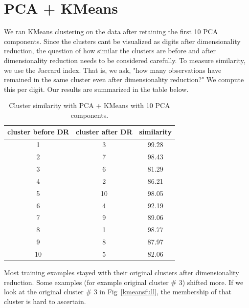 \documentclass[10pt,letterpaper]{article}
\begin{document}
\section{PCA + KMeans}
We ran KMeans clustering on the data after retaining the first 10 PCA components. Since the clusters cant be visualized as digits after dimensionality reduction, the question of how similar the clusters are before and after dimensionality reduction needs to be considered carefully. To measure similarity, we use the Jaccard index. That is, we ask, "how many observations have remained in the same cluster even after dimensionality reduction?" We compute this per digit. Our results are summarized in the table below. 
\begin{table}[tbp]
\begin{center}
\begin{tabular}{c|c|c }
\hline
{\bf cluster before DR}&{\bf cluster after DR}&{\bf similarity} \\ \hline
1 &3&99.28 \\
2 & 7& 98.43\\
3 &6&81.29 \\
4&2&86.21\\
5&10&98.05\\
6&4&92.19\\
7&9&89.06\\
8&1&98.77\\
9&8&87.97\\
10&5&82.06\\ \hline
\end{tabular}
\end{center}
\caption{Cluster similarity with PCA + KMeans with 10 PCA components. \label{kmpca}}
\end{table}
Most training examples stayed with their original clusters after dimensionality reduction. Some examples (for example original cluster \# 3) shifted more. If we look at the original cluster \# 3 in Fig~\ref{kmeansfull}, the membership of that cluster is hard to ascertain.
\end{document}
